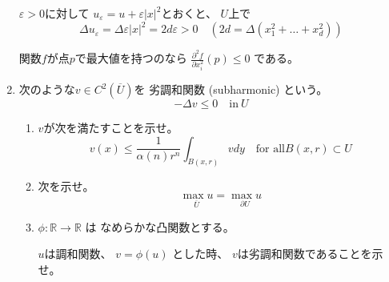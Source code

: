 \documentclass[12pt,b5paper]{ltjsarticle}
\begin{document}
\begin{enumerate}
      $\varepsilon>0$に対して
      $u_{\varepsilon}=u+\varepsilon \lvert x \rvert^{2}$とおくと、
      $U$上で
      \begin{equation}
       \Delta u_{\varepsilon}
        = \Delta \varepsilon \lvert x \rvert^{2}
        = 2d\varepsilon
        >0
        \quad
        (2d=\Delta (x_{1}^{2}+\dots +x_{d}^{2}))
      \end{equation}

      関数$f$が点$p$で最大値を持つのなら
      $\frac{\partial^{2} f}{\partial x_{i}^{2}}(p) \leq 0$
      である。


      \hrulefill

 \item

      次のような$v\in C^{2}(\overline{U})$を 劣調和関数 (subharmonic) という。
      \begin{equation}
       -\Delta v \leq 0 \quad \text{in}\: U
      \end{equation}


      \begin{enumerate}
       \item

            $v$が次を満たすことを示せ。
            \begin{equation}
             v(x) \leq \frac{1}{\alpha(n)r^{n}}
              \int_{B(x,r)} v dy
              \quad \text{for all} B(x,r) \subset U
            \end{equation}

            \dotfill



            \hrulefill

       \item

            次を示せ。
            \begin{equation}
             \underset{\overline{U}}{\max {u}}
              = \underset{\partial{U}}{\max {u}}
            \end{equation}

            \dotfill



            \hrulefill

       \item

            $\phi : \mathbb{R}\to\mathbb{R}$
            は
            なめらかな凸関数とする。

            $u$は調和関数、
            $v = \phi(u)$
            とした時、
            $v$は劣調和関数であることを示せ。


\end{enumerate}
\end{enumerate}
\end{document}
